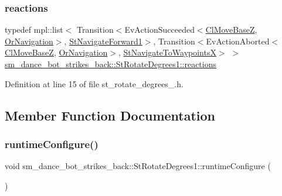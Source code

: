 \subsubsection{\texorpdfstring{reactions}{reactions}}
{\footnotesize\ttfamily typedef mpl\+::list$<$ Transition$<$Ev\+Action\+Succeeded$<$\hyperlink{classmove__base__z__client_1_1ClMoveBaseZ}{Cl\+Move\+BaseZ}, \hyperlink{classsm__dance__bot__strikes__back_1_1OrNavigation}{Or\+Navigation}$>$, \hyperlink{structsm__dance__bot__strikes__back_1_1StNavigateForward1}{St\+Navigate\+Forward1}$>$, Transition$<$Ev\+Action\+Aborted$<$\hyperlink{classmove__base__z__client_1_1ClMoveBaseZ}{Cl\+Move\+BaseZ}, \hyperlink{classsm__dance__bot__strikes__back_1_1OrNavigation}{Or\+Navigation}$>$, \hyperlink{structsm__dance__bot__strikes__back_1_1StNavigateToWaypointsX}{St\+Navigate\+To\+WaypointsX}$>$ $>$ \hyperlink{structsm__dance__bot__strikes__back_1_1StRotateDegrees1_ac753fd21a410d0201e6577ada7edcaa4}{sm\+\_\+dance\+\_\+bot\+\_\+strikes\+\_\+back\+::\+St\+Rotate\+Degrees1\+::reactions}}



Definition at line 15 of file st\+\_\+rotate\+\_\+degrees\+\_.\+h.



\subsection{Member Function Documentation}
\mbox{\label{structsm__dance__bot__strikes__back_1_1StRotateDegrees1_acc975cf0fb7eb2b7e606f456e96953fa}} 
\subsubsection{\texorpdfstring{runtime\+Configure()}{runtimeConfigure()}}
{\footnotesize\ttfamily void sm\+\_\+dance\+\_\+bot\+\_\+strikes\+\_\+back\+::\+St\+Rotate\+Degrees1\+::runtime\+Configure (\begin{DoxyParamCaption}{ }\end{DoxyParamCaption})\hspace{0.3cm}{\ttfamily [inline]}}



